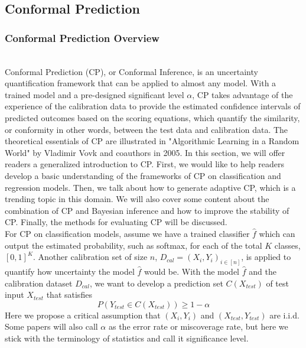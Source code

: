 \subsection{Conformal Prediction}
\subsubsection{Conformal Prediction Overview}\hfill\\
Conformal Prediction (CP), or Conformal Inference,  is an uncertainty quantification framework that can be applied to almost any model.  With a trained model and a pre-designed significant level $\alpha$, CP takes advantage of the experience of the calibration data to provide the estimated confidence intervals of predicted outcomes based on the scoring equations, which quantify the similarity, or conformity in other words, between the test data and calibration data. The theoretical essentials of CP are illustrated in "Algorithmic Learning in a Random World"\cite{vovk2005algorithmic} by Vladimir Vovk and coauthors in 2005. In this section, we will offer readers a generalized introduction to CP. First, we would like to help readers develop a basic understanding of the frameworks of CP on classification and regression models. Then, we talk about how to generate adaptive CP, which is a trending topic in this domain. We will also cover some content about the combination of CP and Bayesian inference and how to improve the stability of CP. Finally, the methods for evaluating CP will be discussed.\\

\noindent For CP on classification models, assume we have a trained classifier $\hat{f}$ which can output the estimated probability, such as softmax, for each of the total $K$ classes, $[0,1]^K$. Another calibration set of size $n$, $D_{cal}=(X_i,Y_i)_{i\in[n]}$, is applied to quantify how uncertainty the model $\hat{f}$ would be.  With the model $\hat{f}$ and the calibration dataset $D_{cal}$, we want to develop a prediction set $C(X_{test})$ of test input $X_{test}$ that satisfies
\begin{equation} 
P(Y_{test}\in C(X_{test})) \ge 1-\alpha\tag{4.2.1-1}
\end{equation}
Here we propose a critical assumption that $(X_i, Y_i)$ and $(X_{test}, Y_{test})$ are i.i.d. Some papers will also call $\alpha$ as the error rate or miscoverage rate, but here we stick with the terminology of statistics and call it significance level.\\

